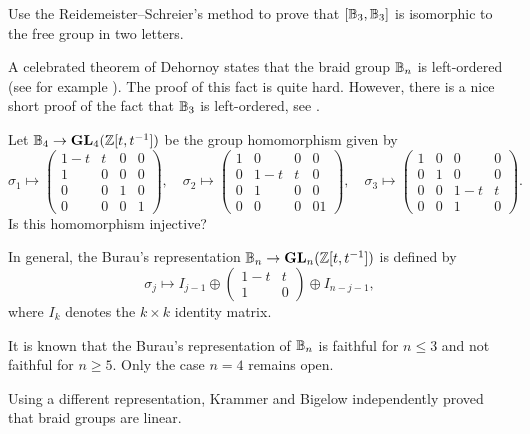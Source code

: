 \begin{exercise}
\label{xca:derivedB3}
    Use the Reidemeister--Schreier's method to prove that 
    $[\mathbb{B}_3,\mathbb{B}_3]$ is isomorphic to the free group in two letters.
\end{exercise}

A celebrated theorem of Dehornoy states that the braid group $\mathbb{B}_n$ 
is left-ordered (see for example \cite[Theorem 7.15]{MR2435235}). The proof of this fact is quite hard. However, 
there is a nice short proof of the fact that 
$\mathbb{B}_3$ is left-ordered, see 
\cite[\S7.2]{MR3560661}.

\begin{problem}
    Let $\mathbb{B}_4\to\mathbf{GL}_4(\mathbb{Z}[t,t^{-1}])$ be the group 
    homomorphism given by
    \[
    \sigma_1\mapsto\begin{pmatrix}
    1-t&t&0&0\\
    1&0&0&0\\
    0&0&1&0\\
    0&0&0&1
    \end{pmatrix},
    \quad
    \sigma_2\mapsto\begin{pmatrix}
    1&0&0&0\\
    0&1-t&t&0\\
    0&1&0&0\\
    0&0&0&01
    \end{pmatrix},
    \quad
    \sigma_3\mapsto\begin{pmatrix}
    1&0&0&0\\
    0&1&0&0\\
    0&0&1-t&t\\
    0&0&1&0
    \end{pmatrix}.
    \]
    Is this homomorphism injective?
\end{problem}

In general, the Burau's representation
$\mathbb{B}_n\to\mathbf{GL}_{n}(\mathbb{Z}[t,t^{-1}])$ 
is defined
by
\[
\sigma_j\mapsto
I_{j-1}\oplus
\begin{pmatrix}
1-t & t\\
1 & 0
\end{pmatrix}
\oplus
I_{n-j-1},
\]
where $I_k$ denotes the $k\times k$ identity matrix. 

It is known that the Burau's representation of $\mathbb{B}_n$ is faithful
for $n\leq3$ and not faithful for $n\geq5$. Only the case
$n=4$ remains open.

Using a different representation,  
Krammer \cite{MR1888796} and Bigelow \cite{MR1815219} 
independently proved that braid groups are linear. 

